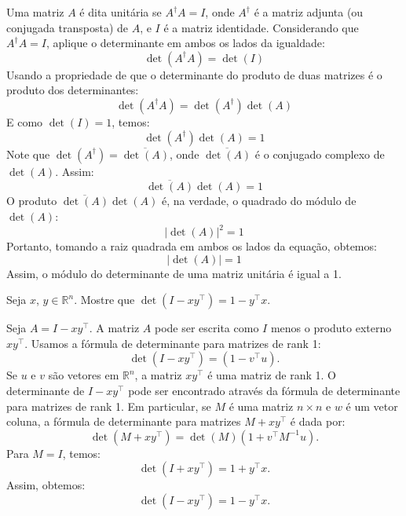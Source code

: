 \begin{resolution}
  Uma matriz $A$ é dita unitária se $A^\dagger A = I$, onde $A^\dagger$ é a matriz adjunta (ou conjugada transposta) de $A$, e $I$ é a matriz identidade. Considerando que $A^\dagger A = I$, aplique o determinante em ambos os lados da igualdade:
  \begin{equation}
    \det(A^\dagger A) = \det(I)
  \end{equation}
  Usando a propriedade de que o determinante do produto de duas matrizes é o produto dos determinantes:
  \begin{equation}
    \det(A^\dagger A) = \det(A^\dagger) \det(A)
  \end{equation}
  E como $\det(I) = 1$, temos:
  \begin{equation}
    \det(A^\dagger) \det(A) = 1
  \end{equation}
  Note que $\det(A^\dagger) = \overline{\det(A)}$, onde $\overline{\det(A)}$ é o conjugado complexo de $\det(A)$. Assim:
  \begin{equation}
    \overline{\det(A)} \det(A) = 1
  \end{equation}
  O produto $\overline{\det(A)} \det(A)$ é, na verdade, o quadrado do módulo de $\det(A)$:
  \begin{equation}
    |\det(A)|^2 = 1
  \end{equation}
  Portanto, tomando a raiz quadrada em ambos os lados da equação, obtemos:
  \begin{equation}
    |\det(A)| = 1
  \end{equation}
  Assim, o módulo do determinante de uma matriz unitária é igual a 1.
\end{resolution}

\begin{question}
  Seja $x$, $y \in \mathbb{R}^n$. Mostre que $\det (I-xy^{\top}) = 1 - y^{\top}x$.
\end{question}
\begin{resolution}
  Seja \(A = I - xy^\top\). A matriz \(A\) pode ser escrita como \(I\) menos o produto externo \(xy^\top\). Usamos a fórmula de determinante para matrizes de rank 1:
  \begin{equation}
    \det(I - xy^\top) = (1 - v^\top u).
  \end{equation}
  Se \(u\) e \(v\) são vetores em \(\mathbb{R}^n\), a matriz \(xy^\top\) é uma matriz de rank 1. O determinante de \(I - xy^\top\) pode ser encontrado através da fórmula de determinante para matrizes de rank 1. Em particular, se \(M\) é uma matriz \(n \times n\) e \(w\) é um vetor coluna, a fórmula de determinante para matrizes \(M + xy^\top\) é dada por:
  \begin{equation}
    \det(M + xy^\top) = \det(M) \left(1 + v^\top M^{-1} u\right).
  \end{equation}
  Para \(M = I\), temos:
  \begin{equation}
    \det(I + xy^\top) = 1 + y^\top x.
  \end{equation}
  Assim, obtemos:
  \begin{equation}
    \det(I - xy^\top) = 1 - y^\top x.
  \end{equation}
\end{resolution}


